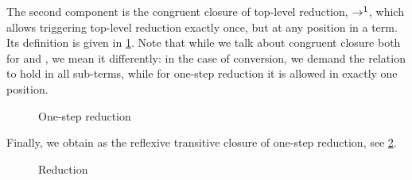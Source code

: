 The second component is the congruent closure of top-level reduction,
 $\rightarrow^1$, which allows triggering top-level reduction exactly once,
but at any position in a term. Its definition is given in \cref{fig:ccw-ored}.
Note that while we talk about congruent closure both for
 and , we mean it differently: in the
case of conversion, we demand the relation to hold in all sub-terms,
while for one-step reduction it is allowed in exactly one position.

\begin{figure}[ht]
  \ContinuedFloat
  \caption{One-step reduction}
  \label{fig:ccw-ored}
\end{figure}

Finally, we obtain  as the reflexive
transitive closure of one-step reduction, see \cref{fig:red}.

\begin{figure}[h]
  \caption{Reduction}
  \label{fig:red}
\end{figure}

